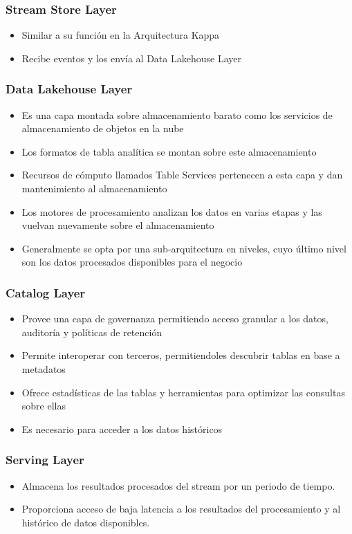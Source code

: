 \subsubsection{Stream Store Layer}
\begin{itemize}
    \item Similar a su función en la Arquitectura Kappa
    \item Recibe eventos y los envía al Data Lakehouse Layer
\end{itemize}

\subsubsection{Data Lakehouse Layer}
\begin{itemize}
    \item Es una capa montada sobre almacenamiento barato como los servicios de almacenamiento de objetos en la nube
    \item Los formatos de tabla analítica se montan sobre este almacenamiento
    \item Recursos de cómputo llamados Table Services pertenecen a esta capa y dan mantenimiento al almacenamiento 
    \item Los motores de procesamiento analizan los datos en varias etapas y las vuelvan nuevamente sobre el almacenamiento
    \item Generalmente se opta por una sub-arquitectura en niveles, cuyo último nivel son los datos procesados disponibles para el negocio
\end{itemize}

\subsubsection{Catalog Layer}
\begin{itemize}
    \item Provee una capa de governanza permitiendo acceso granular a los datos, auditoría y políticas de retención
    \item Permite interoperar con terceros, permitiendoles descubrir tablas en base a metadatos
    \item Ofrece estadísticas de las tablas y herramientas para optimizar las consultas sobre ellas
    \item Es necesario para acceder a los datos históricos
\end{itemize}

\subsubsection{Serving Layer}
\begin{itemize}
    \item Almacena los resultados procesados del stream por un periodo de tiempo.
    \item Proporciona acceso de baja latencia a los resultados del procesamiento y al histórico de datos disponibles.
\end{itemize}

